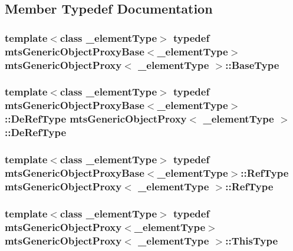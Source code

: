 \subsection{Member Typedef Documentation}
\hypertarget{classmts_generic_object_proxy_a8635f88c647c718cee6f7760529c27a5}{
\subsubsection[{Base\-Type}]{\setlength{\rightskip}{0pt plus 5cm}template$<$class \-\_\-element\-Type$>$ typedef {\bf mts\-Generic\-Object\-Proxy\-Base}$<$\-\_\-element\-Type$>$ {\bf mts\-Generic\-Object\-Proxy}$<$ \-\_\-element\-Type $>$\-::{\bf Base\-Type}}}\label{classmts_generic_object_proxy_a8635f88c647c718cee6f7760529c27a5}
\hypertarget{classmts_generic_object_proxy_a5bab9bef15f9fef5e51f0060cf50e8d5}{
\subsubsection[{De\-Ref\-Type}]{\setlength{\rightskip}{0pt plus 5cm}template$<$class \-\_\-element\-Type$>$ typedef {\bf mts\-Generic\-Object\-Proxy\-Base}$<$\-\_\-element\-Type$>$\-::{\bf De\-Ref\-Type} {\bf mts\-Generic\-Object\-Proxy}$<$ \-\_\-element\-Type $>$\-::{\bf De\-Ref\-Type}}}\label{classmts_generic_object_proxy_a5bab9bef15f9fef5e51f0060cf50e8d5}
\hypertarget{classmts_generic_object_proxy_aa1632a227bbb41bbfaeb4b2ccd90ed6a}{
\subsubsection[{Ref\-Type}]{\setlength{\rightskip}{0pt plus 5cm}template$<$class \-\_\-element\-Type$>$ typedef {\bf mts\-Generic\-Object\-Proxy\-Base}$<$\-\_\-element\-Type$>$\-::{\bf Ref\-Type} {\bf mts\-Generic\-Object\-Proxy}$<$ \-\_\-element\-Type $>$\-::{\bf Ref\-Type}}}\label{classmts_generic_object_proxy_aa1632a227bbb41bbfaeb4b2ccd90ed6a}
\hypertarget{classmts_generic_object_proxy_a03ddcddca7f7515d81de5a0031d175a2}{
\subsubsection[{This\-Type}]{\setlength{\rightskip}{0pt plus 5cm}template$<$class \-\_\-element\-Type$>$ typedef {\bf mts\-Generic\-Object\-Proxy}$<$\-\_\-element\-Type$>$ {\bf mts\-Generic\-Object\-Proxy}$<$ \-\_\-element\-Type $>$\-::{\bf This\-Type}}}\label{classmts_generic_object_proxy_a03ddcddca7f7515d81de5a0031d175a2}
